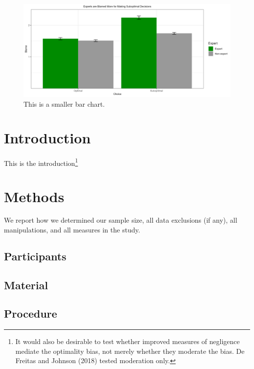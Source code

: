 \documentclass[
  man,floatsintext]{apa6}
\begin{document}
\begin{figure}
\includegraphics[width=6.67in]{blamebarchart} \caption{This is a smaller bar chart.}\label{fig:fig-resolutebar}
\end{figure}

\hypertarget{introduction}{%
\section{Introduction}\label{introduction}}

This is the introduction\footnote{It would also be desirable to test whether improved measures of negligence mediate the optimality bias, not merely whether they moderate the bias. De Freitas and Johnson (2018) tested moderation only.}

\hypertarget{methods}{%
\section{Methods}\label{methods}}

We report how we determined our sample size, all data exclusions (if any), all manipulations, and all measures in the study.

\hypertarget{participants}{%
\subsection{Participants}\label{participants}}

\hypertarget{material}{%
\subsection{Material}\label{material}}

\hypertarget{procedure}{%
\subsection{Procedure}\label{procedure}}
\end{document}
